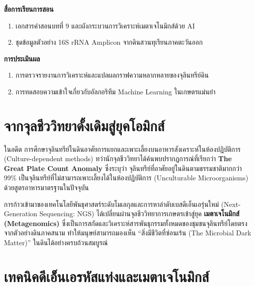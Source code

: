 \noindent\textbf{สื่อการเรียนการสอน}
\begin{enumerate}
    \item เอกสารคำสอนบทที่ 9 และผังกระบวนการวิเคราะห์เมตาเจโนมิกส์ด้วย AI
    \item ชุดข้อมูลตัวอย่าง 16S rRNA Amplicon จากดินสวนทุเรียนภาคตะวันออก
\end{enumerate}

\noindent\textbf{การประเมินผล}
\begin{enumerate}
    \item การตรวจรายงานการวิเคราะห์และแปลผลกราฟความหลากหลายของจุลินทรีย์ดิน
    \item การทดสอบความเข้าใจเกี่ยวกับอัลกอริทึม Machine Learning ในเกษตรแม่นยำ
\end{enumerate}

\newpage


\section{จากจุลชีววิทยาดั้งเดิมสู่ยุคโอมิกส์}

ในอดีต การศึกษาจุลินทรีย์ในดินอาศัยการแยกและเพาะเลี้ยงบนอาหารสังเคราะห์ในห้องปฏิบัติการ (Culture-dependent methods) ทว่านักจุลชีววิทยาได้ค้นพบปรากฏการณ์ที่เรียกว่า \textbf{The Great Plate Count Anomaly} ซึ่งระบุว่า จุลินทรีย์ที่อาศัยอยู่ในดินตามธรรมชาติมากกว่า 99\% เป็นจุลินทรีย์ที่ไม่สามารถเพาะเลี้ยงได้ในห้องปฏิบัติการ (Unculturable Microorganisms) ด้วยสูตรอาหารมาตรฐานในปัจจุบัน

การก้าวเข้ามาของเทคโนโลยีพันธุศาสตร์ระดับโมเลกุลและการหาลำดับเบสดีเอ็นเอรุ่นใหม่ (Next-Generation Sequencing: NGS) ได้เปลี่ยนผ่านจุลชีววิทยาการเกษตรเข้าสู่ยุค \textbf{เมตาเจโนมิกส์ (Metagenomics)} ซึ่งเป็นการสกัดและวิเคราะห์สารพันธุกรรมทั้งหมดของชุมชนจุลินทรีย์โดยตรงจากตัวอย่างดินภาคสนาม ทำให้มนุษย์สามารถมองเห็น “สิ่งมีชีวิตที่ซ่อนเร้น (The Microbial Dark Matter)” ในดินได้อย่างครบถ้วนสมบูรณ์

\section{เทคนิคดีเอ็นเอรหัสแท่งและเมตาเจโนมิกส์}

